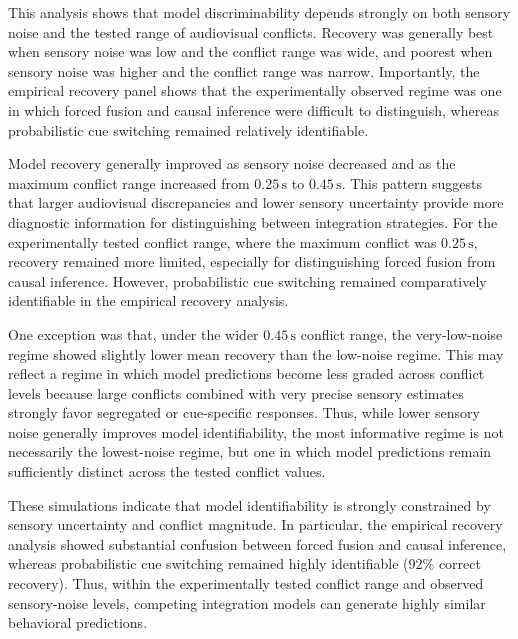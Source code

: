 \documentclass{jov}
\begin{document}
This analysis shows that model discriminability depends strongly on both sensory noise and the tested range of audiovisual conflicts. Recovery was generally best when sensory noise was low and the conflict range was wide, and poorest when sensory noise was higher and the conflict range was narrow. Importantly, the empirical recovery panel shows that the experimentally observed regime was one in which forced fusion and causal inference were difficult to distinguish, whereas probabilistic cue switching remained relatively identifiable.

Model recovery generally improved as sensory noise decreased and as the maximum conflict range increased from $0.25\,\mathrm{s}$ to $0.45\,\mathrm{s}$. This pattern suggests that larger audiovisual discrepancies and lower sensory uncertainty provide more diagnostic information for distinguishing between integration strategies. For the experimentally tested conflict range, where the maximum conflict was $0.25\,\mathrm{s}$, recovery remained more limited, especially for distinguishing forced fusion from causal inference. However, probabilistic cue switching remained comparatively identifiable in the empirical recovery analysis.

One exception was that, under the wider $0.45\,\mathrm{s}$ conflict range, the very-low-noise regime showed slightly lower mean recovery than the low-noise regime. This may reflect a regime in which model predictions become less graded across conflict levels because large conflicts combined with very precise sensory estimates strongly favor segregated or cue-specific responses. Thus, while lower sensory noise generally improves model identifiability, the most informative regime is not necessarily the lowest-noise regime, but one in which model predictions remain sufficiently distinct across the tested conflict values.

These simulations indicate that model identifiability is strongly constrained by sensory uncertainty and conflict magnitude. In particular, the empirical recovery analysis showed substantial confusion between forced fusion and causal inference, whereas probabilistic cue switching remained highly identifiable ($92\%$ correct recovery). Thus, within the experimentally tested conflict range and observed sensory-noise levels, competing integration models can generate highly similar behavioral predictions.

\end{document}
